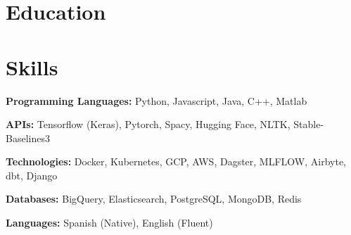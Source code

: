 \documentclass{ExpressiveResume}
\begin{document}
\section{Education}




\section{Skills}

 {\bf Programming Languages:} Python, Javascript, Java, C++, Matlab

    {\bf APIs:} Tensorflow (Keras), Pytorch, Spacy, Hugging Face, NLTK, Stable-Baselines3

{\bf Technologies:} Docker, Kubernetes, GCP, AWS, Dagster, MLFLOW,
Airbyte, dbt, Django

    {\bf Databases:} BigQuery, Elasticsearch, PostgreSQL, MongoDB, Redis

    {\bf Languages:} Spanish (Native), English (Fluent)
\end{document}
